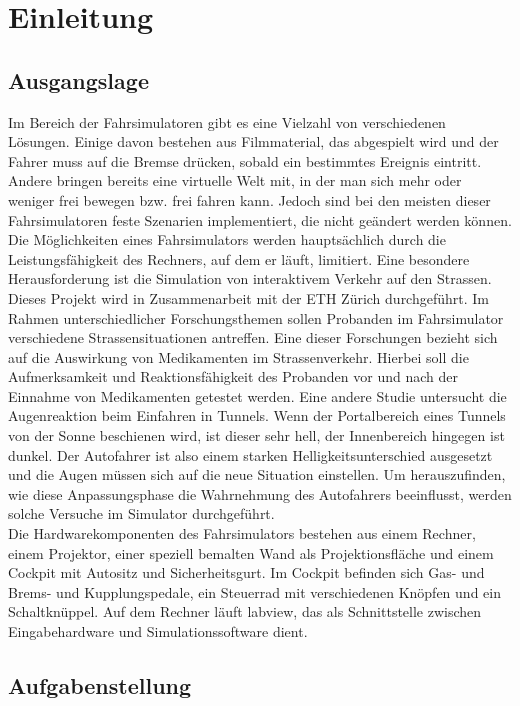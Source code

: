\section{Einleitung}
\subsection{Ausgangslage}

Im Bereich der Fahrsimulatoren gibt es eine Vielzahl von verschiedenen Lösungen. Einige davon bestehen aus Filmmaterial, das abgespielt wird und der Fahrer muss auf die Bremse drücken, sobald ein bestimmtes Ereignis eintritt. Andere  bringen bereits eine virtuelle Welt mit, in der man sich mehr oder weniger frei bewegen bzw. frei fahren kann. Jedoch sind bei den meisten dieser Fahrsimulatoren feste Szenarien implementiert, die  nicht geändert werden können. Die Möglichkeiten eines Fahrsimulators werden hauptsächlich durch die Leistungsfähigkeit des Rechners, auf dem er läuft, limitiert. Eine besondere Herausforderung ist die Simulation von interaktivem Verkehr auf den Strassen. \\
Dieses Projekt wird in Zusammenarbeit mit der ETH Zürich durchgeführt. Im Rahmen unterschiedlicher Forschungsthemen sollen Probanden im Fahrsimulator verschiedene Strassensituationen antreffen. Eine dieser Forschungen bezieht sich auf die Auswirkung von Medikamenten im Strassenverkehr. Hierbei soll die Aufmerksamkeit und Reaktionsfähigkeit des Probanden vor und nach der Einnahme von Medikamenten getestet werden. Eine andere Studie untersucht die Augenreaktion beim Einfahren in Tunnels. Wenn der Portalbereich eines Tunnels von der Sonne beschienen wird, ist dieser sehr hell, der Innenbereich hingegen ist dunkel. Der Autofahrer ist also einem starken Helligkeitsunterschied ausgesetzt und die Augen müssen sich auf die neue Situation einstellen. Um herauszufinden, wie diese Anpassungsphase die Wahrnehmung des Autofahrers beeinflusst, werden solche Versuche im Simulator durchgeführt.\\
Die Hardwarekomponenten des Fahrsimulators bestehen aus einem Rechner, einem Projektor, einer speziell bemalten Wand als Projektionsfläche und einem Cockpit mit Autositz und Sicherheitsgurt. Im Cockpit befinden sich Gas- und Brems- und Kupplungspedale, ein Steuerrad mit verschiedenen Knöpfen und ein Schaltknüppel. Auf dem Rechner läuft \gls{labview}, das als Schnittstelle zwischen Eingabehardware und Simulationssoftware dient.

\subsection{Aufgabenstellung}
